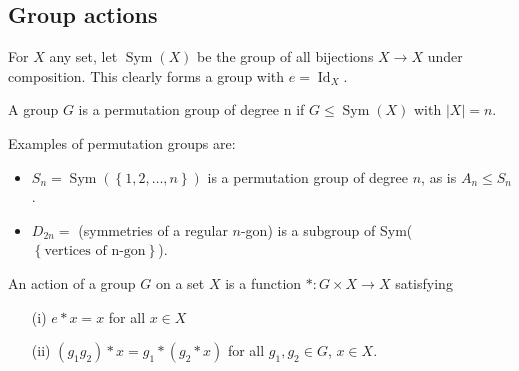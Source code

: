 \documentclass[egregdoesnotlikesansseriftitles,a4paper]{scrartcl}
\begin{document}
\subsection{Group actions}
\begin{definition*}
      For $X$ any set, let $\operatorname{Sym}(X)$ be the group of all bijections $X \rightarrow X$ under composition. This clearly forms a group with $e=\operatorname{Id}_X$.

      A group $G$ is a permutation group of degree n if $G \leq \operatorname{Sym}(X)$ with $|X|=n$. 
\end{definition*}
\begin{example*}
      Examples of permutation groups are:
      \begin{itemize}
           \item $S_{n}=\operatorname{Sym}(\left\{1,2,\ldots ,n\right\})$ is a permutation group of degree $n$, as is $A_{n}\leq S_{n}$.
           \item $D_{2n}=$ (symmetries of a regular $n$-gon) is a subgroup of Sym($\left\{\text{vertices of n-gon}\right\}$).
      \end{itemize}
\end{example*}
\begin{definition*}
      An action of a group $G$ on a set $X$ is a function $\ast: G \times X \rightarrow X$ satisfying 
      \begin{itemize}
           \item[(i)] $e \ast x =x $ for all $x \in X$ 
           \item[(ii)] $(g_1 g_2 )\ast x= g_1 \ast (g_2 \ast x)$ for all $g_1 ,g_2 \in G$, $x \in X$.
      \end{itemize}
\end{definition*}
\end{document}
